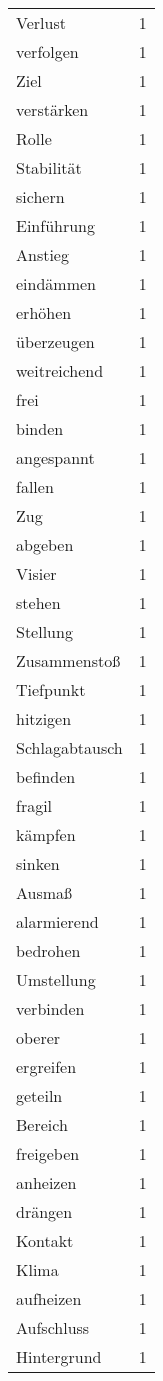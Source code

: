 \begin{tabular}{lr}
Verlust & 1 \\
verfolgen & 1 \\
Ziel & 1 \\
verstärken & 1 \\
Rolle & 1 \\
Stabilität & 1 \\
sichern & 1 \\
Einführung & 1 \\
Anstieg & 1 \\
eindämmen & 1 \\
erhöhen & 1 \\
überzeugen & 1 \\
weitreichend & 1 \\
frei & 1 \\
binden & 1 \\
angespannt & 1 \\
fallen & 1 \\
Zug & 1 \\
abgeben & 1 \\
Visier & 1 \\
stehen & 1 \\
Stellung & 1 \\
Zusammenstoß & 1 \\
Tiefpunkt & 1 \\
hitzigen & 1 \\
Schlagabtausch & 1 \\
befinden & 1 \\
fragil & 1 \\
kämpfen & 1 \\
sinken & 1 \\
Ausmaß & 1 \\
alarmierend & 1 \\
bedrohen & 1 \\
Umstellung & 1 \\
verbinden & 1 \\
oberer & 1 \\
ergreifen & 1 \\
geteiln & 1 \\
Bereich & 1 \\
freigeben & 1 \\
anheizen & 1 \\
drängen & 1 \\
Kontakt & 1 \\
Klima & 1 \\
aufheizen & 1 \\
Aufschluss & 1 \\
Hintergrund & 1 \\

\end{tabular}
